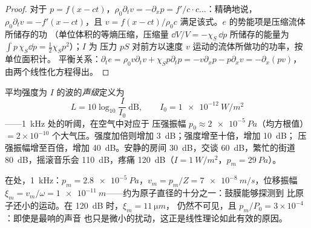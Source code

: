 \begin{proof}
对于 $p = f(x - ct)$，$\rho_0\partial_tv = -\partial_xp = f'/c\cdot c\dots$：精确地说，
$\rho_0\partial_tv = -f'(x - ct)$，且 $v = f(x - ct)/\rho_0c$ 满足该式。$e$ 的势能项是压缩流体所储存的功
（单位体积的等熵压缩，压缩量 $\dd V/V = -\chi_S\,\dd p$
所储存的能量为 $\int p\,\chi_S\dd p = \tfrac12\chi_Sp^2$）；$I$ 为
压力 $pS$ 对前方以速度 $v$ 运动的流体所做功的功率，按单位面积计。
平衡关系：$\partial_te = \rho_0v\partial_tv + \chi_Sp\partial_tp = -v\partial_xp - p\partial_xv =
-\partial_x(pv)$，
由两个线性化方程得出。
\end{proof}

\begin{definition}[声级]\label{def:b2:sound-waves:decibel}
平均强度为 $I$ 的波的\emph{声级}定义为
\[
L = 10\log_{10}\frac I{I_0} \ \text{dB} , \qquad I_0 = \qty{1e-12}{W/m^2}
\]
——\qty{1}{kHz} 处的听阈，在空气中对应于
压强振幅 $p_0 \approx \qty{2e-5}{Pa}$（均方根值）$= 2 \times 10^{-10}$
个大气压。强度加倍则增加 \qty{3}{dB}；强度增至十倍，增加 \qty{10}{dB}；
压强振幅增至百倍，增加 \qty{40}{dB}。安静的房间
\qty{30}{dB}，交谈 \qty{60}{dB}，繁忙的街道 \qty{80}{dB}，摇滚音乐会
\qty{110}{dB}，疼痛 \qty{120}{dB}（$I = \qty{1}{W/m^2}$，$p_m = \qty{29}{Pa}$）。
\end{definition}

\begin{example}[声音有多微弱]\label{ex:b2:sound-waves:small}
在处，\qty{1}{kHz}：$p_m = \qty{2.8e-5}{Pa}$，$v_m = p_m/Z =
\qty{7e-8}{m/s}$，位移振幅 $\xi_m = v_m/\omega =
\qty{1e-11}{m}$——约为原子直径的十分之一：鼓膜能够探测到
比原子还小的运动。在 \qty{120}{dB} 时，$\xi_m = \qty{11}{\micro m}$，
仍然不可见，且 $p_m/P_0 = 3 \times 10^{-4}$：即使是最响的声音
也只是微小的扰动，这正是线性理论如此有效的原因。
\end{example}

